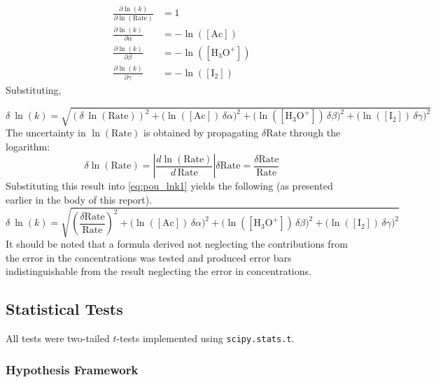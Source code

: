 \begin{align*}
    \frac{\partial \ln(k)}{\partial \ln(\mathrm{Rate})} &= 1 \\[4pt]
    \frac{\partial \ln(k)}{\partial \alpha} &= -\ln([\mathrm{Ac}]) \\[4pt]
    \frac{\partial \ln(k)}{\partial \beta}  &= -\ln([\mathrm{H_3O^+}]) \\[4pt]
    \frac{\partial \ln(k)}{\partial \gamma} &= -\ln([\mathrm{I_2}])
\end{align*}
Substituting,

\begin{equation}
    \delta \ {\ln(k)} = \sqrt{
        \left(\delta \ {\ln(\mathrm{Rate})}\right)^2
      + \bigl(\ln([\mathrm{Ac}])\,\delta\alpha\bigr)^2
      + \bigl(\ln([\mathrm{H_3O^+}])\,\delta\beta\bigr)^2
      + \bigl(\ln([\mathrm{I_2}])\,\delta\gamma\bigr)^2
    }
    \label{eq:pou_lnk1}
\end{equation}
The uncertainty in $\ln(\mathrm{Rate})$ is obtained by propagating $\delta\mathrm{Rate}$ through the logarithm:
\begin{equation*}
    \delta\ln(\mathrm{Rate}) = \left|\frac{d\ln(\mathrm{Rate})}{d\,\mathrm{Rate}}\right| \delta\mathrm{Rate} = \frac{\delta\mathrm{Rate}}{\mathrm{Rate}}
\end{equation*}
Substituting this result into \cref{eq:pou_lnk1} yields the following (as presented earlier in the body of this report).
\begin{equation}
    \delta \ {\ln(k)} = \sqrt{
        \left( {\frac{\delta\mathrm{Rate}}{\mathrm{Rate}}}\right)^2
      + \bigl(\ln([\mathrm{Ac}])\,\delta\alpha\bigr)^2
      + \bigl(\ln([\mathrm{H_3O^+}])\,\delta\beta\bigr)^2
      + \bigl(\ln([\mathrm{I_2}])\,\delta\gamma\bigr)^2
    }
    \label{eq:pou_lnk2}
\end{equation}
It should be noted that a formula derived not neglecting the contributions from the error in the concentrations was tested and produced error bars indistinguishable from the result neglecting the error in concentrations.

\subsection{Statistical Tests}
\label{app:tests}

All tests were two-tailed $t$-tests implemented using \texttt{scipy.stats.t}.

\subsubsection*{Hypothesis Framework}

